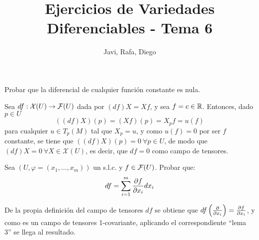 \documentclass[twoside]{article}
\newcounter{ejercicio}
\begin{document}
\title{Ejercicios de Variedades Diferenciables - Tema 6}
\author{Javi, Rafa, Diego}
\maketitle

\begin{ejercicio}{1}
Probar que la diferencial de cualquier función constante es nula.
\end{ejercicio}
\begin{solucion}
Sea $df:\mathcal{X}(U)\to\mathcal{F}(U)$ dada por $(df)X=Xf$, y sea $f=c\in\mathbb{R}$. Entonces, dado $p\in U$
$$((df)X)(p)=(Xf)(p)=X_pf=u(f)$$
para cualquier $u\in T_p(M)$ tal que $X_p=u$, y como $u(f)=0$ por ser $f$ constante, se tiene que $((df)X)(p)=0\ \forall p\in U$, de modo que $(df)X=0\ \forall X\in\mathcal{X}(U)$, es decir, que $df=0$ como campo de tensores. 
\end{solucion}

\newpage

\begin{ejercicio}{2}
Sea $(U, \varphi = (x_1, \dots, x_m))$ un s.l.c. y $f \in \mathcal{F}(U)$. Probar que:
$$df =
\sum^m_{i=1}
\frac{\partial f}{\partial x_i}dx_i$$
\end{ejercicio}
\begin{solucion}
De la propia definición del campo de tensores $df$ se obtiene que $df\left(\frac{\partial }{\partial x_i}\right)=\frac{\partial f}{\partial x_i}$, y como es un campo de tensores 1-covariante, aplicando el correspondiente ``lema 3'' se llega al resultado.
\end{solucion}
\end{document}
